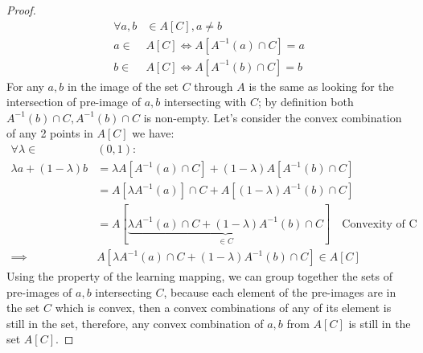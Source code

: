 \documentclass[]{article}
\theoremstyle{definition}
\begin{document}
    \begin{proof}
        \begin{align}
            \forall a,b &\in A[C], a\neq b
            \\
            a \in& A[C] \iff A[A^{-1}(a)\cap C] = a
            \\
            b \in& A[C] \iff A[A^{-1}(b)\cap C] = b
        \end{align}
        For any $a, b$ in the image of the set $C$ through $A$ is the same as looking for the intersection of pre-image of $a, b$ intersecting with $C$; by definition both $A^{-1}(b)\cap C, A^{-1}(b)\cap C$ is non-empty. 
        \noindent
        Let's consider the convex combination of any 2 points in $A[C]$  we have: 
        \begin{align}
            \forall \lambda \in& (0, 1): 
            \\
            \lambda a + (1 - \lambda)b 
            &= \lambda A[A^{-1}(a)\cap C] + (1 - \lambda)A[A^{-1}(b)\cap C]
            \\
            &= A[\lambda A^{-1}(a)]\cap C + A[(1 - \lambda)A^{-1}(b)\cap C]
            \\
            &= A[\underbrace{\lambda A^{-1}(a)\cap C + (1 - \lambda)A^{-1}(b)\cap C}_{\in C}] \quad \text{Convexity of C}
            \\
            \implies&  
            A[\lambda A^{-1}(a)\cap C + (1 - \lambda) A^{-1}(b)\cap C] 
            \in A[C]
        \end{align}
        Using the property of the learning mapping, we can group together the sets of pre-images of $a,b$ intersecting $C$, because each element of the pre-images are in the set $C$ which is convex, then a convex combinations of any of its element is still in the set, therefore, any convex combination of $a, b$ from $A[C]$ is still in the set $A[C]$. 
    \end{proof}
\end{document}

